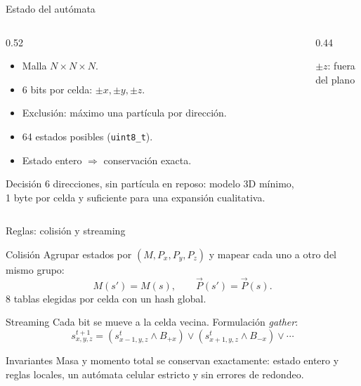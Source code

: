 \documentclass[aspectratio=169]{beamer}
\begin{document}
\begin{frame}{Estado del autómata}
  \begin{columns}[T]
    \begin{column}{0.52\textwidth}
      \begin{itemize}
        \item Malla $N\times N\times N$.
        \item 6 bits por celda: $\pm x,\pm y,\pm z$.
        \item Exclusión: máximo una partícula por dirección.
        \item 64 estados posibles (\texttt{uint8\_t}).
        \item Estado entero $\Rightarrow$ conservación exacta.
      \end{itemize}
      \begin{block}{Decisión}
        \footnotesize
        6 direcciones, \alert{sin partícula en reposo}: modelo 3D mínimo,
        1 byte por celda y suficiente para una expansión cualitativa.
      \end{block}
    \end{column}
    \begin{column}{0.44\textwidth}
      \centering
      \vspace{2mm}
      {\scriptsize $\pm z$: fuera del plano}
    \end{column}
  \end{columns}
\end{frame}

\begin{frame}{Reglas: colisión y streaming}
  \begin{block}{Colisión}
    \footnotesize
    Agrupar estados por $(M,P_x,P_y,P_z)$ y mapear cada uno a otro del mismo
    grupo:
    \[
      M(s')=M(s),\qquad \vec{P}(s')=\vec{P}(s).
    \]
    8 tablas elegidas por celda con un hash global.
  \end{block}
  \begin{block}{Streaming}
    \footnotesize
    Cada bit se mueve a la celda vecina. Formulación \emph{gather}:
    \[
      s^{t+1}_{x,y,z}=(s^t_{x-1,y,z}\wedge B_{+x})
      \vee(s^t_{x+1,y,z}\wedge B_{-x})\vee\cdots
    \]
  \end{block}
  \begin{alertblock}{Invariantes}
    \footnotesize
    Masa y momento total se conservan \alert{exactamente}: estado entero y
    reglas locales, un autómata celular estricto y sin errores de redondeo.
  \end{alertblock}
\end{frame}
\end{document}
